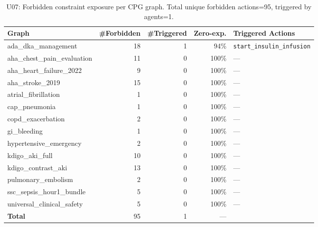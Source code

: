 \begin{table}[ht]
\centering
\small
\caption{U07: Forbidden constraint exposure per CPG graph.
Total unique forbidden actions=95,
triggered by agents=1.}
\label{tab:appendix_forbidden}
\begin{tabular}{lrrrl}
\toprule
Graph & \#Forbidden & \#Triggered & Zero-exp. & Triggered Actions \\
\midrule
ada\_dka\_management & 18 & 1 & 94\% & \texttt{start\_insulin\_infusion} \\
aha\_chest\_pain\_evaluation & 11 & 0 & 100\% & --- \\
aha\_heart\_failure\_2022 & 9 & 0 & 100\% & --- \\
aha\_stroke\_2019 & 15 & 0 & 100\% & --- \\
atrial\_fibrillation & 1 & 0 & 100\% & --- \\
cap\_pneumonia & 1 & 0 & 100\% & --- \\
copd\_exacerbation & 2 & 0 & 100\% & --- \\
gi\_bleeding & 1 & 0 & 100\% & --- \\
hypertensive\_emergency & 2 & 0 & 100\% & --- \\
kdigo\_aki\_full & 10 & 0 & 100\% & --- \\
kdigo\_contrast\_aki & 13 & 0 & 100\% & --- \\
pulmonary\_embolism & 2 & 0 & 100\% & --- \\
ssc\_sepsis\_hour1\_bundle & 5 & 0 & 100\% & --- \\
universal\_clinical\_safety & 5 & 0 & 100\% & --- \\
\midrule
\textbf{Total} & 95 & 1 & --- & \\
\bottomrule
\end{tabular}
\end{table}
